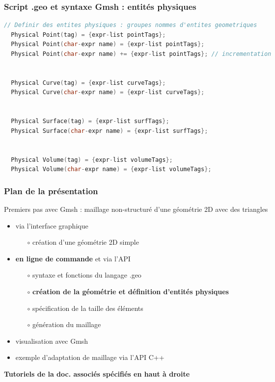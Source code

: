 \documentclass[aspectratio=169]{beamer}
\begin{document}
\begin{frame}[fragile]
\frametitle{Script .geo et syntaxe Gmsh : entités physiques}
\begin{lstlisting}[language=c++]
  // Definir des entites physiques : groupes nommes d'entites geometriques
  Physical Point(tag) = {expr-list pointTags};
  Physical Point(char-expr name) = {expr-list pointTags};
  Physical Point(char-expr name) += {expr-list pointTags}; // incrementation


  Physical Curve(tag) = {expr-list curveTags};
  Physical Curve(char-expr name) = {expr-list curveTags};


  Physical Surface(tag) = {expr-list surfTags};
  Physical Surface(char-expr name) = {expr-list surfTags};


  Physical Volume(tag) = {expr-list volumeTags};
  Physical Volume(char-expr name) = {expr-list volumeTags};
\end{lstlisting}
\end{frame}

\begin{frame}[fragile]
\frametitle{Plan de la présentation}
Premiers pas avec Gmsh : maillage non-structuré d'une géométrie 2D avec des triangles
\begin{itemize}
  \item via l'interface graphique
  \begin{itemize}
    \item[$\circ$] création d'une géométrie 2D simple
  \end{itemize}
  \item \textbf{en ligne de commande} et via l'API
  \begin{itemize}
    \item[$\circ$] syntaxe et fonctions du langage .geo
    \item[$\circ$] \textbf{création de la géométrie et définition d'entités physiques}
    \item[$\circ$] spécification de la taille des éléments
    \item[$\circ$] génération du maillage
  \end{itemize}
  \item visualisation avec Gmsh
  \item exemple d'adaptation de maillage via l'API C++
\end{itemize}
{\color{blue} \textbf{Tutoriels de la doc. associés spécifiés en haut à droite}}
\end{frame}
\end{document}
